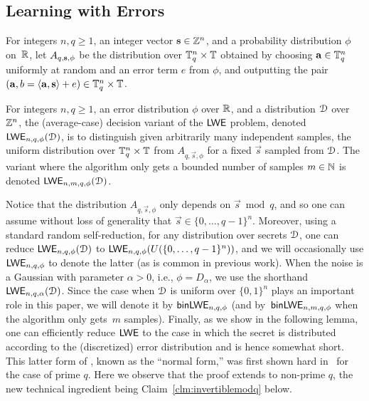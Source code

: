 \subsection{Learning with Errors}
\label{sec:computational_problems}

For integers $n,q \ge 1$, an integer vector $\mathbf{s}
\in \mathbb{Z}^n$, and a probability distribution $\phi$ on~$\mathbb{R}$, let
$A_{q,\mathbf{s}, \phi}$ be the distribution over $\mathbb{T}_q^n \times \mathbb{T}$
obtained by choosing $\mathbf{a} \in \mathbb{T}_q^n$ uniformly at random and an
error term $e$ from $\phi$, and outputting the pair $(\mathbf{a}, b =
\langle\mathbf{a}, \mathbf{s}\rangle+e) \in \mathbb{T}_q^n \times \mathbb{T}$.

\begin{definition}
  \label{def:lwe}
  For integers $n,q \ge 1$, an error distribution $\phi$
  over $\mathbb{R}$, and a distribution $\mathcal{D}$ over $\mathbb{Z}^n$, the (average-case) decision variant of the $\mathsf{LWE}$
  problem, denoted $\mathsf{LWE}_{n,q,\phi}(\mathcal{D})$, is to distinguish 
	given arbitrarily many independent samples,
  the uniform distribution over $\mathbb{T}_q^n \times \mathbb{T}$ from
  $A_{q,\vec{s},\phi}$ for a fixed $\vec{s}$ sampled from $\mathcal{D}$. The variant where the algorithm only gets a bounded number of samples $m\in{\mathbb N}$ is denoted $\mathsf{LWE}_{n,m,q,\phi}(\mathcal{D})$.
\end{definition}

Notice that the distribution $A_{q,\vec{s},\phi}$ only depends on $\vec{s} \bmod q$, and so one can assume
without loss of generality that $\vec{s} \in \{0,\ldots,q-1\}^n$. Moreover, using a standard
random self-reduction, for any distribution over secrets $\mathcal{D}$, one can reduce $\mathsf{LWE}_{n,q,\phi}(\mathcal{D})$ to
$\mathsf{LWE}_{n,q,\phi}(U(\{0,\ldots,q-1\}^n))$, and we will occasionally use $\mathsf{LWE}_{n,q,\phi}$ to denote the latter
(as is common in previous work). 
When the noise is a Gaussian with parameter $\alpha>0$, i.e., $\phi=D_\alpha$,
we use the shorthand $\mathsf{LWE}_{n,q,\alpha}(\mathcal{D})$.
Since the case when $\mathcal{D}$ is uniform over $\{0,1\}^n$ plays an important
role in this paper, we will denote it by $\mathsf{binLWE}_{n,q,\phi}$ (and by~$\mathsf{binLWE}_{n,m,q,\phi}$ when the algorithm only gets~$m$ samples). Finally, as we show in the following lemma, 
one can efficiently reduce $\mathsf{LWE}$ to the case in which the secret
is distributed according to the (discretized) error distribution and is hence somewhat short. This latter
form of \lwe, known as the ``normal form,'' was first shown hard in~\cite{DBLP:conf/crypto/ApplebaumCPS09}
for the case of prime $q$.
Here we observe that the proof extends to non-prime $q$, the new technical ingredient being Claim~\ref{clm:invertiblemodq} below.

